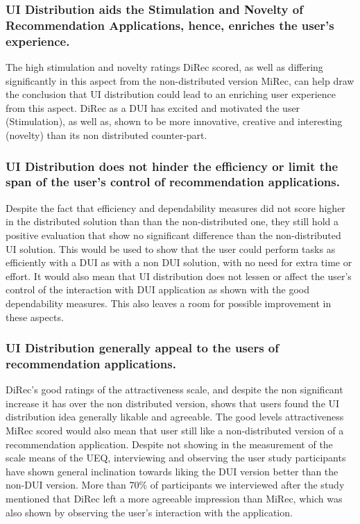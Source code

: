 \subsubsection{UI Distribution aids the Stimulation and Novelty of Recommendation
Applications, hence, enriches the user's experience.} The high stimulation and
novelty ratings DiRec scored, as well as differing significantly in this aspect
from the non-distributed version MiRec, can help draw the conclusion that UI
distribution could lead to an enriching user experience from this aspect.
DiRec as a DUI has excited and motivated the user (Stimulation), as well as,
shown to be more innovative, creative and interesting (novelty) than its non
distributed counter-part.
 
\subsubsection{UI Distribution does not hinder the efficiency or limit the span
of the user's control of recommendation applications.} Despite the fact that
efficiency and dependability measures did not score higher in the distributed
solution than than the non-distributed one, they still hold a positive
evaluation that show no significant difference than the non-distributed UI
solution. This would be used to show that the user could perform tasks as
efficiently with a DUI as with a non DUI solution, with no need for extra time
or effort. It would also mean that UI distribution does not lessen or affect the
user's control of the interaction with DUI application as shown with the good
dependability measures. This also leaves a room for possible improvement in
these aspects.

\subsubsection{UI Distribution generally appeal to the users of recommendation
applications.} DiRec's good ratings of the attractiveness scale, and despite
the non significant increase it has over the non distributed version, shows that
users found the UI distribution idea generally likable and agreeable. The good
levels attractiveness MiRec scored would also mean that user still like a
non-distributed version of a recommendation application. Despite not showing in
the measurement of the scale means of the UEQ, interviewing and observing the
user study participants have shown general inclination towards liking the DUI
version better than the non-DUI version. More than 70\% of participants we
interviewed after the study mentioned that DiRec left a more agreeable
impression than MiRec, which was also shown by observing the user's interaction
with the application.

